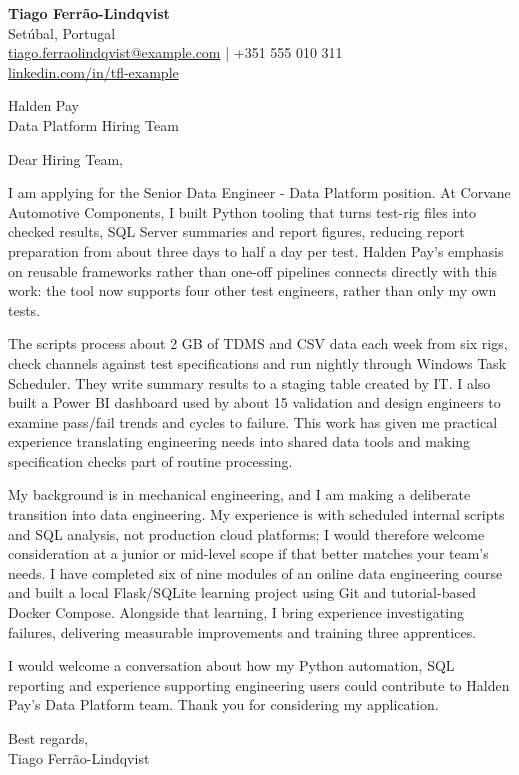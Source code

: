 \documentclass[11pt,a4paper]{article}
\begin{document}
{\large\bfseries\color{primarycolor} Tiago Ferrão-Lindqvist}\\
Setúbal, Portugal\\
\href{mailto:tiago.ferraolindqvist@example.com}{tiago.ferraolindqvist@example.com} | +351 555 010 311\\
\href{https://linkedin.com/in/tfl-example}{linkedin.com/in/tfl-example}

Halden Pay\\
Data Platform Hiring Team

Dear Hiring Team,

I am applying for the Senior Data Engineer - Data Platform position. At Corvane Automotive Components, I built Python tooling that turns test-rig files into checked results, SQL Server summaries and report figures, reducing report preparation from about three days to half a day per test. Halden Pay's emphasis on reusable frameworks rather than one-off pipelines connects directly with this work: the tool now supports four other test engineers, rather than only my own tests.

The scripts process about 2 GB of TDMS and CSV data each week from six rigs, check channels against test specifications and run nightly through Windows Task Scheduler. They write summary results to a staging table created by IT. I also built a Power BI dashboard used by about 15 validation and design engineers to examine pass/fail trends and cycles to failure. This work has given me practical experience translating engineering needs into shared data tools and making specification checks part of routine processing.

My background is in mechanical engineering, and I am making a deliberate transition into data engineering. My experience is with scheduled internal scripts and SQL analysis, not production cloud platforms; I would therefore welcome consideration at a junior or mid-level scope if that better matches your team's needs. I have completed six of nine modules of an online data engineering course and built a local Flask/SQLite learning project using Git and tutorial-based Docker Compose. Alongside that learning, I bring experience investigating failures, delivering measurable improvements and training three apprentices.

I would welcome a conversation about how my Python automation, SQL reporting and experience supporting engineering users could contribute to Halden Pay's Data Platform team. Thank you for considering my application.

Best regards,\\
Tiago Ferrão-Lindqvist
\end{document}
